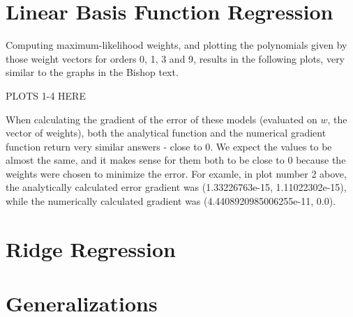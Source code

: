\documentclass{paper}
\begin{document}
\section{Linear Basis Function Regression}

Computing maximum-likelihood weights, and plotting the polynomials given by those weight vectors for orders 0, 1, 3 and 9, results in the following plots, very similar to the graphs in the Bishop text.

PLOTS 1-4 HERE

When calculating the gradient of the error of these models (evaluated on $w$, the vector of weights), both the analytical function and the numerical gradient function return very similar answers - close to 0. We expect the values to be almost the same, and it makes sense for them both to be close to 0 because the weights were chosen to minimize the error. For examle, in plot number 2 above, the analytically calculated error gradient was (1.33226763e-15, 1.11022302e-15), while the numerically calculated gradient was (4.4408920985006255e-11, 0.0).

\section{Ridge Regression}



\section{Generalizations}
\end{document}
